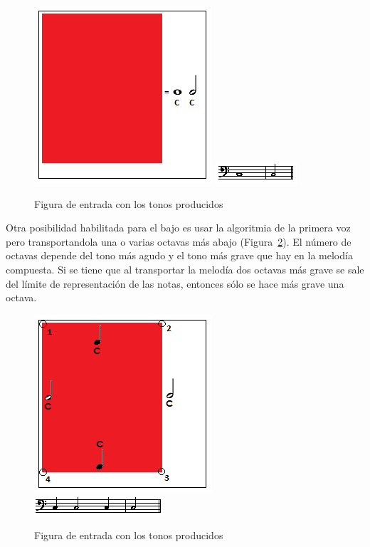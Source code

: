 		\begin{figure}[htbp]
		\centering
		\hspace*{0.0in}
		\includegraphics[scale=1]{graphics/simpletest2-F2F3.png}
		\includegraphics[scale=1]{graphics/simpletest2-BASSpartitura.png}
		\caption{Figura de entrada con los tonos producidos}
		\label{fig:Figura1Voz3}
		\end{figure}

Otra posibilidad habilitada para el bajo es usar la algoritmia de la primera voz pero transportandola una o varias octavas más abajo (Figura~\ref{fig:Figura2Voz3}). El número de octavas depende del tono más agudo y el tono más grave que hay en la melodía compuesta. Si se tiene que al transportar la melodía dos octavas más grave se sale del límite de representación de las notas, entonces sólo se hace más grave una octava.

		\begin{figure}[htbp]
		\centering
		\hspace*{0.0in}
		\includegraphics[scale=1]{graphics/simpletest2-F2F3_2.png}
		\includegraphics[scale=1]{graphics/simpletest3_2-BASSpartitura.png}
		\caption{Figura de entrada con los tonos producidos}
		\label{fig:Figura2Voz3}
		\end{figure}

